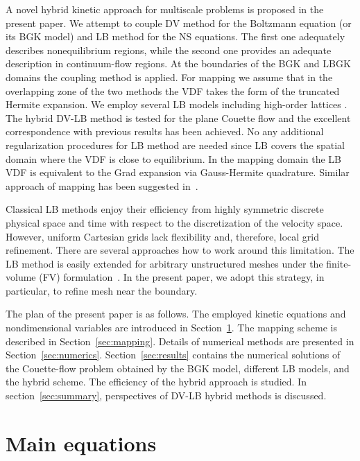 \documentclass[]{elsarticle} %
\begin{document}
{%
A novel hybrid kinetic approach for multiscale problems is proposed in the present paper.
We attempt to couple DV method for the Boltzmann equation (or its BGK model) and LB method for the NS equations.
The first one adequately describes nonequilibrium regions, while the second one provides an adequate description in continuum-flow regions.
At the boundaries of the BGK and LBGK domains the coupling method is applied.
For mapping we assume that in the overlapping zone of the two methods the VDF takes the form of the truncated Hermite expansion.
We employ several LB models including high-order lattices \cite{Shan2006, Feuchter2016}.
The hybrid DV-LB method is tested for the plane Couette flow and the excellent correspondence with previous results has been achieved.
No any additional regularization procedures \cite{Latt2006, Mont2015} for LB method are needed
since LB covers the spatial domain where the VDF is close to equilibrium.
In the mapping domain the LB VDF is equivalent to the Grad expansion via Gauss-Hermite quadrature.
Similar approach of mapping has been suggested in~\cite{Staso2016short, Staso2016long, Staso2018}.

Classical LB methods enjoy their efficiency from highly symmetric discrete physical space and time
with respect to the discretization of the velocity space.
However, uniform Cartesian grids lack flexibility and, therefore, local grid refinement.
There are several approaches how to work around this limitation.
The LB method is easily extended for arbitrary unstructured meshes
under the finite-volume (FV) formulation~\cite{Succi1992, Peng1999, Patil2009, Li2016}.
In the present paper, we adopt this strategy, in particular, to refine mesh near the boundary.

The plan of the present paper is as follows.
The employed kinetic equations and nondimensional variables are introduced in Section~\ref{sec:equations}.
The mapping scheme is described in Section~\ref{sec:mapping}.
Details of numerical methods are presented in Section~\ref{sec:numerics}.
Section~\ref{sec:results} contains the numerical solutions of the Couette-flow problem
obtained by the BGK model, different LB models, and the hybrid scheme.
The efficiency of the hybrid approach is studied.
In section~\ref{sec:summary}, perspectives of DV-LB hybrid methods is discussed.

\section{Main equations}\label{sec:equations}

}
\end{document}

